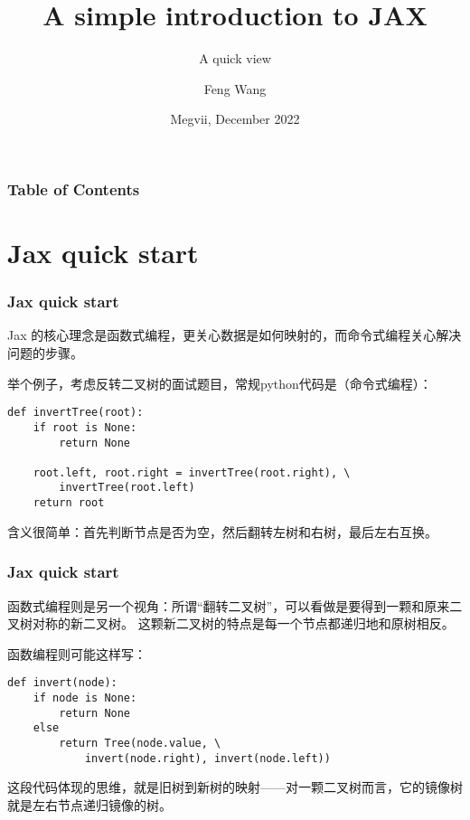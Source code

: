 \documentclass{beamer}
\title[Intro to jax] %
{A simple introduction to JAX}
\subtitle{A quick view}
\author[Feng Wang] %
{Feng Wang\inst{1}}
\institute[megvii] %
{
  \inst{1}%
  Megvii\\
  wangfeng02@megvii.com
}
\date[megvii 2022] %
{Megvii, December 2022}
\begin{document}
\frame{\titlepage}


\begin{frame}
\frametitle{Table of Contents}
\tableofcontents
\end{frame}


\section{Jax quick start}

\begin{frame}[fragile]
\frametitle{Jax quick start}
Jax 的核心理念是函数式编程，更关心数据是如何映射的，而命令式编程关心解决问题的步骤。\newline

举个例子，考虑反转二叉树的面试题目，常规python代码是（命令式编程）：

\begin{verbatim}
def invertTree(root):
    if root is None:
        return None

    root.left, root.right = invertTree(root.right), \
        invertTree(root.left)
    return root

\end{verbatim}

含义很简单：首先判断节点是否为空，然后翻转左树和右树，最后左右互换。
\end{frame}

\begin{frame}[fragile]
\frametitle{Jax quick start}

函数式编程则是另一个视角：所谓“翻转二叉树”，可以看做是要得到一颗和原来二叉树对称的新二叉树。
这颗新二叉树的特点是每一个节点都递归地和原树相反。\newline

函数编程则可能这样写：\newline

\begin{verbatim}
def invert(node):
    if node is None:
        return None
    else
        return Tree(node.value, \
            invert(node.right), invert(node.left))

\end{verbatim}

这段代码体现的思维，就是旧树到新树的映射——对一颗二叉树而言，它的镜像树就是左右节点递归镜像的树。
\end{frame}
\end{document}

